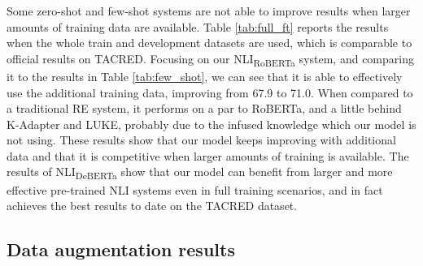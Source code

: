 \documentclass[11pt]{article}
\begin{document}
Some zero-shot and few-shot systems are not able to improve results when larger amounts of training data are available. 
Table \ref{tab:full_ft} reports the results when the whole train and development datasets are used, which is comparable to official results on TACRED. Focusing on our NLI\textsubscript{RoBERTa} system, and comparing it to the results in Table \ref{tab:few_shot}, 
we can see that it is able to effectively use the additional training data, improving from 67.9 to 71.0. When compared to a traditional RE system, it performs on a par to RoBERTa, and a little behind K-Adapter and LUKE, probably due to the infused knowledge which our model is not using. These results show that our model keeps improving with additional data and that it is competitive when larger amounts of training is available. The results of NLI\textsubscript{DeBERTa} show that our model can benefit from larger and more effective pre-trained NLI systems even in full training scenarios, and in fact achieves the best results to date on the TACRED dataset. 






\subsection{Data augmentation results}

\begin{table}
    \centering
    \caption{Data Augmentation scenario results (F1) for different gold training sizes. Silver annotations by the zero-shot and few-shot NLI\textsubscript{RoBERTa} model.}
    \label{tab:data_aug}
\end{table}
\end{document}
